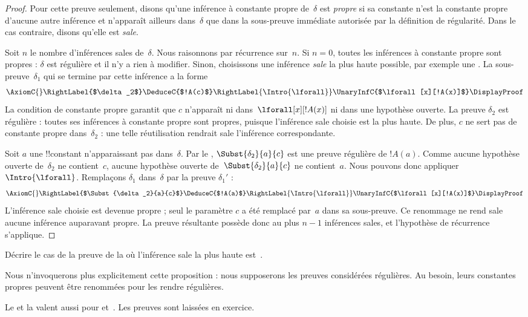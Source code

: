 \documentclass[../../../include/open-logic-section]{subfiles}
\begin{document}
\begin{proof}
Pour cette preuve seulement, disons qu'une inférence à constante
propre de~$\delta$ est \emph{propre} si sa constante n'est
la constante propre d'aucune autre inférence et n'apparaît
ailleurs dans~$\delta$ que dans la sous-preuve immédiate
autorisée par la définition de régularité.
Dans le cas contraire, disons qu'elle est \emph{sale}.

Soit $n$ le nombre d'inférences sales de~$\delta$.
Nous raisonnons par récurrence sur~$n$.
Si $n=0$, toutes les inférences à constante propre sont propres :
$\delta$ est régulière et il n'y a rien à modifier.
Sinon, choisissons une inférence \emph{sale} la plus haute possible,
par exemple une \Intro{\lforall}.
La sous-preuve~$\delta_1$ qui se termine par cette inférence
a la forme
\[
    \AxiomC{}
    \RightLabel{$\delta_2$}
    \DeduceC{$!A(c)$}
    \RightLabel{\Intro{\lforall}}
    \UnaryInfC{$\lforall[x][!A(x)]$}
    \DisplayProof
    \]
La condition de constante propre garantit que $c$ n'apparaît
ni dans~$\lforall[x][!A(x)]$ ni dans une hypothèse ouverte.
La preuve $\delta_2$ est régulière : toutes ses inférences
à constante propre sont propres, puisque l'inférence sale
choisie est la plus haute. De plus, $c$ ne sert pas de
constante propre dans~$\delta_2$ : une telle réutilisation
rendrait sale l'inférence correspondante.


Soit $a$ une !!{constant} n'apparaissant pas dans~$\delta$.
Par le , $\Subst{\delta_2}{a}{c}$
est une preuve régulière de $!A(a)$.
Comme aucune hypothèse ouverte de~$\delta_2$ ne contient~$c$,
aucune hypothèse ouverte de~$\Subst{\delta_2}{a}{c}$
ne contient~$a$. Nous pouvons donc appliquer~$\Intro{\lforall}$.
Remplaçons $\delta_1$ dans~$\delta$ par la preuve $\delta_1'$ :
\[
    \AxiomC{}
    \RightLabel{$\Subst{\delta_2}{a}{c}$}
    \DeduceC{$!A(a)$}
    \RightLabel{\Intro{\lforall}}
    \UnaryInfC{$\lforall[x][!A(x)]$}
    \DisplayProof
    \]
L'inférence sale choisie est devenue propre ; seul le paramètre
$c$ a été remplacé par~$a$ dans sa sous-preuve.
Ce renommage ne rend sale aucune inférence auparavant propre.
La preuve résultante possède donc au plus $n-1$ inférences sales,
et l'hypothèse de récurrence s'applique.
\end{proof}

\begin{prob}
Décrire le cas de la preuve de la 
où l'inférence sale la plus haute est~\Elim{\lexists}.
\end{prob}

Nous n'invoquerons plus explicitement cette proposition :
nous supposerons les preuves considérées régulières.
Au besoin, leurs constantes propres peuvent être renommées
pour les rendre régulières.

Le  et la  valent aussi
pour  et~. Les preuves sont laissées en exercice.
\end{document}
